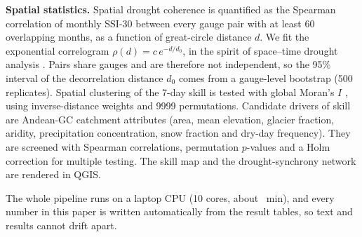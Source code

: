 \documentclass[graybox]{svmult}
\begin{document}
\textbf{Spatial statistics.} Spatial drought coherence is quantified as the Spearman correlation of monthly SSI-30 between every gauge pair with at least 60 overlapping months, as a function of great-circle distance $d$. We fit the exponential correlogram $\rho(d)=c\,e^{-d/d_0}$, in the spirit of space--time drought analysis \cite{tallaksen2009spacetime}. Pairs share gauges and are therefore not independent, so the 95\% interval of the decorrelation distance $d_0$ comes from a gauge-level bootstrap (500 replicates). Spatial clustering of the 7-day skill is tested with global Moran's $I$ \cite{moran1950}, using inverse-distance weights and 9999 permutations. Candidate drivers of skill are Andean-GC catchment attributes (area, mean elevation, glacier fraction, aridity, precipitation concentration, snow fraction and dry-day frequency). They are screened with Spearman correlations, permutation $p$-values and a Holm correction for multiple testing. The skill map and the drought-synchrony network are rendered in QGIS.

The whole pipeline runs on a laptop CPU (10 cores, about \runtimeMin{}~min), and every number in this paper is written automatically from the result tables, so text and results cannot drift apart.







\end{document}
